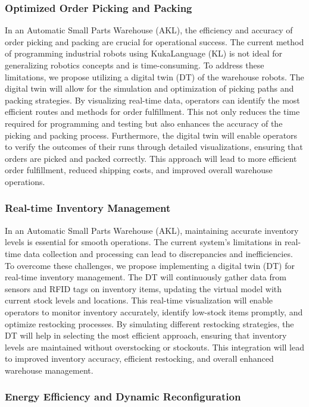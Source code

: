 \subsubsection{Optimized Order Picking and Packing}

In an Automatic Small Parts Warehouse (AKL), 
the efficiency and accuracy of order picking and packing are 
crucial for operational success. 
The current method of programming industrial robots using 
KukaLanguage (KL) is not ideal for generalizing robotics 
concepts and is time-consuming. To address these limitations, 
we propose utilizing a digital twin (DT) of the warehouse robots.
The digital twin will allow for the simulation and optimization 
of picking paths and packing strategies. 
By visualizing real-time data, operators can identify the most 
efficient routes and methods for order fulfillment. 
This not only reduces the time required for programming and 
testing but also enhances the accuracy of the picking and 
packing process.
Furthermore, the digital twin will enable operators to 
verify the outcomes of their runs through detailed 
visualizations, ensuring that orders are picked and packed 
correctly.
This approach will lead to more efficient order fulfillment, 
reduced shipping costs, and improved overall warehouse 
operations.
\subsubsection{Real-time Inventory Management}

In an Automatic Small Parts Warehouse (AKL), 
maintaining accurate inventory levels is essential for 
smooth operations. 
The current system's limitations in real-time data collection 
and processing can lead to discrepancies and inefficiencies. 
To overcome these challenges, we propose implementing a digital 
twin (DT) for real-time inventory management. 
The DT will continuously gather data from sensors and 
RFID tags on inventory items, 
updating the virtual model with current stock levels and 
locations. This real-time visualization will enable operators 
to monitor inventory accurately, 
identify low-stock items promptly, and optimize restocking 
processes. By simulating different restocking strategies, 
the DT will help in selecting the most efficient approach, 
ensuring that inventory levels are maintained without 
overstocking or stockouts. This integration will lead to 
improved inventory accuracy, efficient restocking, and overall 
enhanced warehouse management.

\subsubsection{Energy Efficiency and Dynamic Reconfiguration}

